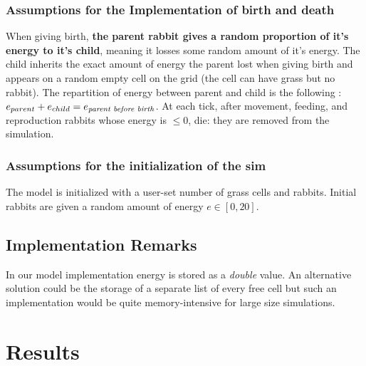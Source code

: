 \documentclass[11pt]{article}
\begin{document}
\subsubsection{Assumptions for the Implementation of birth and death}

When giving birth, \textbf{the parent rabbit gives a random proportion of it's energy to it's child}, meaning it losses some random amount of it's energy. The child inherits the exact amount of energy the parent lost when giving birth and appears on a random empty cell on the grid (the cell can have grass but no rabbit). The repartition of energy between parent and child is the following : $e_{parent} + e_{child} = e_{\text{\textit{parent before birth}}}$. At each tick, after movement, feeding, and reproduction rabbits whose energy is $\leq 0$, die: they are removed from the simulation.

\subsubsection{Assumptions for the initialization of the sim}

The model is initialized with a user-set number of grass cells and rabbits. Initial rabbits are given a random amount of energy $e \in [0,20]$.

\subsection{Implementation Remarks}


In our model implementation energy is stored as a \textit{double} value. An alternative solution could be the storage of a separate list of every free cell but such an implementation would be quite memory-intensive for large size simulations.

\section{Results}
\end{document}
